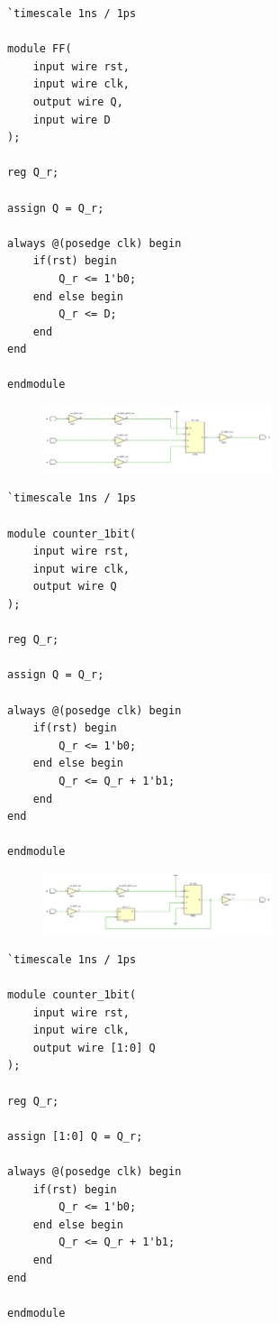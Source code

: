 \documentclass[a4paper,oneside ,10pt]{extreport}
\begin{document}
\begin{Verbatim}[tabsize=4]
`timescale 1ns / 1ps

module FF(
    input wire rst,
    input wire clk,
    output wire Q,
    input wire D
);

reg Q_r;

assign Q = Q_r; 

always @(posedge clk) begin 
    if(rst) begin
        Q_r <= 1'b0;
    end else begin
        Q_r <= D;
    end
end

endmodule
\end{Verbatim}

\begin{figure}[!ht]
	\centering
	\includegraphics[width=0.6\textwidth]{image/FF_0.png}
	\caption{}
	\label{FF_0}
\end{figure}

\begin{Verbatim}[tabsize=4]
`timescale 1ns / 1ps

module counter_1bit(
    input wire rst,
    input wire clk,
    output wire Q
);

reg Q_r;

assign Q = Q_r; 

always @(posedge clk) begin 
    if(rst) begin
        Q_r <= 1'b0;
    end else begin
        Q_r <= Q_r + 1'b1;
    end
end

endmodule
\end{Verbatim}

\begin{figure}[!ht]
	\centering
	\includegraphics[width=0.6\textwidth]{image/FF_1.png}
	\caption{}
	\label{FF_1}
\end{figure}

\begin{Verbatim}[tabsize=4]
`timescale 1ns / 1ps

module counter_1bit(
    input wire rst,
    input wire clk,
    output wire [1:0] Q
);

reg Q_r;

assign [1:0] Q = Q_r; 

always @(posedge clk) begin 
    if(rst) begin
        Q_r <= 1'b0;
    end else begin
        Q_r <= Q_r + 1'b1;
    end
end

endmodule
\end{Verbatim}
\end{document}
